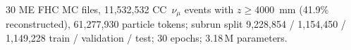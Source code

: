 30 ME FHC MC files, 11{,}532{,}532 CC~$\nu_\mu$ events with $z \ge 4000$~mm (41.9\% reconstructed), 61{,}277{,}930 particle tokens; subrun split 9{,}228{,}854 / 1{,}154{,}450 / 1{,}149{,}228 train / validation / test; 30 epochs; 3.18\,M parameters.
